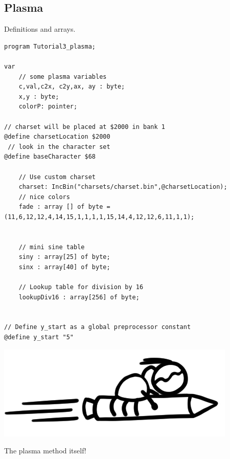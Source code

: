 \subsection{Plasma}
Definitions and arrays.
\\
\begin{minipage}{0.8\textwidth}
\begin{lstlisting}
program Tutorial3_plasma;

var
	// some plasma variables
	c,val,c2x, c2y,ax, ay : byte;
	x,y : byte;
	colorP: pointer;	

// charset will be placed at $2000 in bank 1	
@define charsetLocation $2000
 // look in the character set
@define baseCharacter $68

	// Use custom charset
	charset: IncBin("charsets/charset.bin",@charsetLocation);
	// nice colors
	fade : array [] of byte = (11,6,12,12,4,14,15,1,1,1,1,15,14,4,12,12,6,11,1,1); 
	

	// mini sine table
    siny : array[25] of byte; 
	sinx : array[40] of byte; 

	// Lookup table for division by 16
	lookupDiv16 : array[256] of byte;


// Define y_start as a global preprocessor constant
@define y_start "5"
\end{lstlisting}
\end{minipage}
\begin{minipage}{0.2\textwidth}
\includegraphics[width=\linewidth]{images/trip/trip13.png}
\end{minipage}

The plasma method itself!\\

